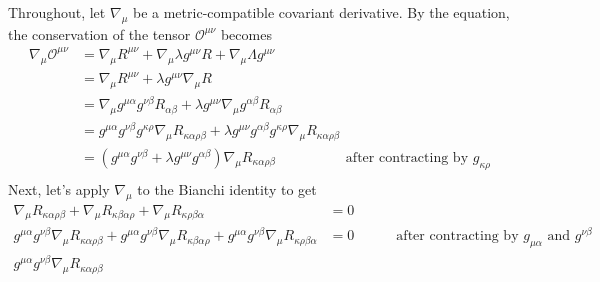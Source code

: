 \documentclass{../../templates/lkx_pset}
\begin{document}
\begin{solution}
	Throughout, let $\nabla_\mu$ be a metric-compatible covariant derivative.
	By the equation, the conservation of the tensor $\mathcal{O}^{\mu\nu}$ becomes
	\[
		\begin{aligned}
			\nabla_\mu \mathcal{O}^{\mu\nu} & = \nabla_\mu R^{\mu\nu} + \nabla_\mu \lambda g^{\mu\nu}R + \nabla_\mu\Lambda g^{\mu\nu}                                                                          \\
			                                & = \nabla_\mu R^{\mu\nu} + \lambda g^{\mu\nu}\nabla_\mu R                                                                                                         \\
			                                & = \nabla_\mu g^{\mu\alpha}g^{\nu\beta}R_{\alpha\beta} + \lambda g^{\mu\nu}\nabla_\mu g^{\alpha\beta}R_{\alpha\beta}                                              \\
			                                & =
			g^{\mu\alpha} g^{\nu\beta} g^{\kappa\rho} \nabla_\mu R_{\kappa\alpha\rho\beta}
			+\lambda g^{\mu\nu}g^{\alpha\beta} g^{\kappa\rho} \nabla_\mu R_{\kappa\alpha\rho\beta}                                                                                                             \\
			                                & = (g^{\mu\alpha}g^{\nu\beta} + \lambda g^{\mu\nu}g^{\alpha\beta}) \nabla_\mu R{_{\kappa\alpha\rho\beta}}\hspace{5em}\textrm{after contracting by }g_{\kappa\rho} \\
		\end{aligned}
	\]
	Next, let's apply $\nabla_\mu$ to the Bianchi identity to get
	\[
		\begin{aligned}
			\nabla_\mu R_{\kappa\alpha\rho\beta} + \nabla_\mu R_{\kappa\beta\alpha\rho} + \nabla_\mu R_{\kappa\rho\beta\alpha}
			                                                              & =0                                                                                    \\
			g^{\mu\alpha} g^{\nu\beta} \nabla_\mu R_{\kappa\alpha\rho\beta} +  g^{\mu\alpha} g^{\nu\beta}  \nabla_\mu R_{\kappa\beta\alpha\rho} + g^{\mu\alpha} g^{\nu\beta} \nabla_\mu R_{\kappa\rho\beta\alpha}
			                                                              & =0 \hspace{3em}\textrm{after contracting by } g_{\mu\alpha}\textrm{ and }g^{\nu\beta} \\
			g^{\mu\alpha} g^{\nu\beta} \nabla_\mu R_{\kappa\alpha\rho\beta}

\end{aligned}\]
\end{solution}
\end{document}
